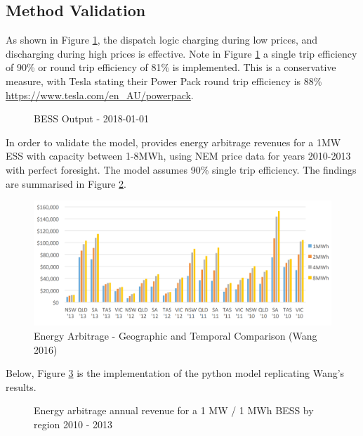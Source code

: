 \subsection{ Method Validation }
As shown in Figure \ref{fig:simple_output}, the dispatch logic charging during low prices, and discharging during high prices is effective. Note in Figure \ref{fig:simple_output} a single trip efficiency of 90\% or round trip efficiency of 81\% is implemented. This is a conservative measure, with Tesla stating their Power Pack round trip efficiency is 88\% \url{https://www.tesla.com/en_AU/powerpack}. 
\begin{figure}[H]
    \centering
    \caption{BESS Output - 2018-01-01}
    \label{fig:simple_output}
\end{figure}
In order to validate the model, \parencite{Wang} provides energy arbitrage revenues for a 1MW ESS with capacity between 1-8MWh, using NEM price data for years 2010-2013 with perfect foresight. The model assumes 90\% single trip efficiency. The findings are summarised in Figure \ref{fig:wang_ea}. 
\begin{figure}[H]
    \centering
    \includegraphics{Pictures/Chapter3/wang_ea.PNG}
    \caption{Energy Arbitrage - Geographic and Temporal Comparison (Wang 2016)}
    \label{fig:wang_ea}
\end{figure}
Below, Figure \ref{fig:wang_ea_comparion} is the implementation of the python model replicating Wang's results. 
\begin{figure}[H]
    \centering
    \caption{Energy arbitrage annual revenue for a 1 MW / 1 MWh BESS by region 2010 - 2013}
    \label{fig:wang_ea_comparion}
\end{figure}
